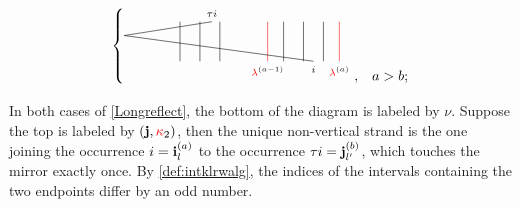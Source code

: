 \begin{gather}
\begin{cases}
\begin{tikzpicture}
        \draw[red] (3.6,0)\botlabel{\rlam^{\textcolor{black}{(a-1)}}} -- (3.6,1);
         \draw[red] (5.4,0)\botlabel{\rlam^{\textcolor{black}{(a)}}} -- (5.4,1);
        \draw[-] (1.4,0) -- (1.4,1)  \toplabel{}
                 (1.9,0) -- (1.9,1)
                 (2.4,0) -- (2.4,1);
        \draw[-] (4,0) -- (4,1)  \toplabel{}
                 (4.5,0) -- (4.5,1)
                 (5,0) -- (5,1);
        \draw[-] (4.75,0) \botlabel{i} -- (0,1-.35) -- (2.2,1) \toplabel{\tau i};
    \end{tikzpicture}, & a>b;
    \end{cases}
\end{gather}

%
%

%
%
In both cases of \cref{Longreflect}, the bottom of the diagram is labeled by $\nu$.  
Suppose the top is labeled by $(\mathbf{j},{\color{red}\kappa}_2)$, then the unique non-vertical strand is the one joining the occurrence \(i=\mathbf{i}^{(a)}_l\) to the occurrence \(\tau i=\mathbf{j}^{(b)}_{l'}\), which touches the mirror exactly once. By \cref{def:intklrwalg}, the indices of the intervals containing the two endpoints differ by an odd number.



